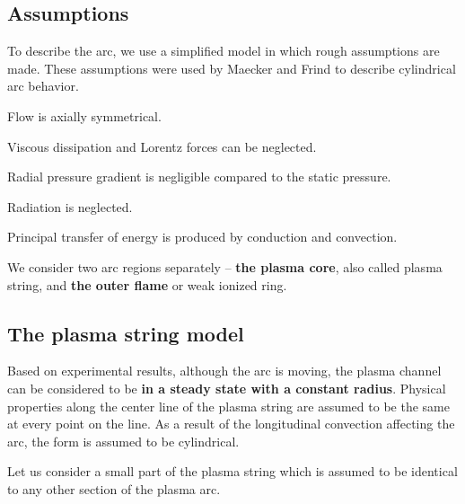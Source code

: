 \subsection{Assumptions}


To describe the arc, we use a simplified model in which
rough assumptions are made. These assumptions were used 
by Maecker and Frind to describe cylindrical arc behavior. 
\begin{enumerate*}
    \item Flow is axially symmetrical.
    \item Viscous dissipation and Lorentz forces can be neglected.
    \item  Radial pressure gradient is negligible compared to the
        static pressure.
    \item  Radiation is neglected.
    \item  Principal transfer of energy is produced by conduction
        and convection.
\end{enumerate*}


We consider two arc regions separately -- 
\textbf{the plasma core}, 
also called plasma string, 
and 
\textbf{the outer flame} or weak ionized ring.




\subsection{The plasma string model}

Based on experimental results, although the arc is moving, the plasma channel can be considered to be \textbf{in a steady state with a constant radius}. Physical properties along the center line of the plasma string are assumed to be the same at
every point on the line. As a result of the longitudinal convection affecting the arc, the form is assumed to be cylindrical.

Let us consider a small part of the plasma string which is assumed to be identical to any other section of the plasma arc.

